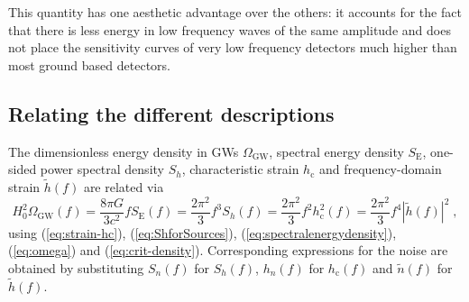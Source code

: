 This quantity has one aesthetic advantage over the others: it accounts for the fact that there is less energy in low frequency waves of the same amplitude and does not place the sensitivity curves of very low frequency detectors much higher than most ground based detectors.

\subsection{Relating the different descriptions}
The dimensionless energy density in GWs $\Omega_{\mathrm{GW}}$, spectral energy density $S_{\mathrm{E}}$, one-sided power spectral density $S_{h}$, characteristic strain $h_\mathrm{c}$ and frequency-domain strain $\tilde{h}(f)$ are related via
\begin{equation}
H_0^2\Omega_{\mathrm{GW}}(f)= \frac{8 \pi G}{3 c^{2}} fS_{\mathrm{E}}(f) = \frac{2\pi^2}{3} f^3 S_h(f) = \frac{2\pi^2}{3} f^2 h_\mathrm{c}^2(f) = \frac{2\pi^2}{3} f^4 \left|\tilde{h}(f)\right|^2\; ,
\end{equation}
using (\ref{eq:strain-hc}), (\ref{eq:ShforSources}), (\ref{eq:spectralenergydensity}), (\ref{eq:omega}) and (\ref{eq:crit-density}).
Corresponding expressions for the noise are obtained by substituting $S_{n}(f)$ for $S_h(f)$, $h_{n}(f)$ for $h_\mathrm{c}(f)$ and $\tilde{n}(f)$ for $\tilde{h}(f)$. 

